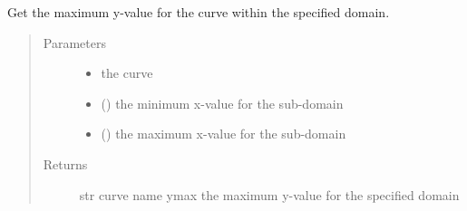 \documentclass[letterpaper,10pt,english]{sphinxmanual}
\begin{document}

\begin{fulllineitems}
\label{\detokenize{pydv:pydvpy.getymax}}
Get the maximum y-value for the curve within the specified domain.
\begin{quote}\begin{description}
\item[{Parameters}] \leavevmode\begin{itemize}
\item {} 
 \textendash{} the curve

\item {} 
 (\sphinxstyleliteralemphasis{\sphinxupquote{, }}) \textendash{} the minimum x-value for the sub-domain

\item {} 
 (\sphinxstyleliteralemphasis{\sphinxupquote{, }}) \textendash{} the maximum x-value for the sub-domain

\end{itemize}

\item[{Returns}] \leavevmode
str \textendash{} curve name
ymax \textendash{} the maximum y-value for the specified domain

\end{description}\end{quote}

\end{fulllineitems}

\end{document}
